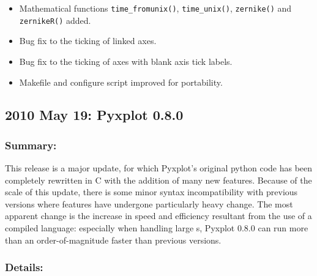 \begin{itemize}
\item Mathematical functions {\tt time\_\-from\-unix()}, {\tt time\_\-unix()}, {\tt zernike()} and {\tt zernikeR()} added.
\item Bug fix to the ticking of linked axes.
\item Bug fix to the ticking of axes with blank axis tick labels.
\item Makefile and configure script improved for portability.
\end{itemize}

\subsection*{2010 May 19: Pyxplot 0.8.0}

\subsubsection*{Summary:}

This release is a major update, for which Pyxplot's original python code has
been completely rewritten in C with the addition of many new features. Because
of the scale of this update, there is some minor syntax incompatibility with
previous versions where features have undergone particularly heavy change. The
most apparent change is the increase in speed and efficiency resultant from the
use of a compiled language: especially when handling large \datafile s, Pyxplot
0.8.0 can run more than an order-of-magnitude faster than previous versions.

\subsubsection*{Details:}

